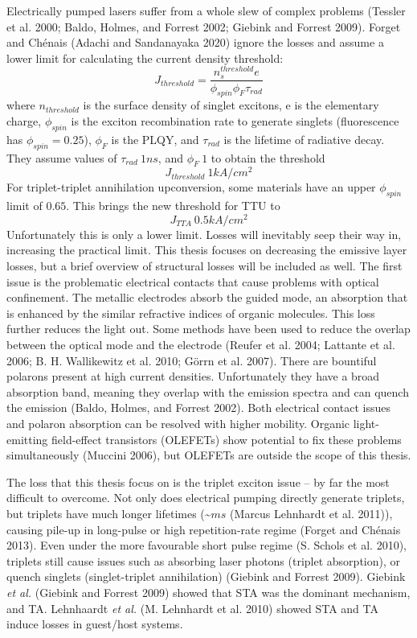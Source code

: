 \documentclass[
  letterpaper,
  DIV=11,
  numbers=noendperiod,
  oneside]{scrreprt}
\begin{document}
Electrically pumped lasers suffer from a whole slew of complex problems
(Tessler et al. 2000; Baldo, Holmes, and Forrest 2002; Giebink and
Forrest 2009). Forget and Chénais (Adachi and Sandanayaka 2020) ignore
the losses and assume a lower limit for calculating the current density
threshold:
\[J_{threshold} = \frac{n_s^{threshold}e}{\phi_{spin} \phi_F\tau_{rad}}\]
where \(n_{threshold}\) is the surface density of singlet excitons, e is
the elementary charge, \(\phi_{spin}\) is the exciton recombination rate
to generate singlets (fluorescence has \(\phi_{spin}=0.25\)), \(\phi_F\)
is the PLQY, and \(\tau_{rad}\) is the lifetime of radiative decay. They
assume values of \(\tau_{rad}~1ns\), and \(\phi_F~1\) to obtain the
threshold \[J_{threshold} ~ 1 kA/cm^2\] For triplet-triplet annihilation
upconversion, some materials have an upper \(\phi_{spin}\) limit of
\(0.65\). This brings the new threshold for TTU to
\[J_{TTA} ~ 0.5 kA/cm^2\] Unfortunately this is only a lower limit.
Losses will inevitably seep their way in, increasing the practical
limit. This thesis focuses on decreasing the emissive layer losses, but
a brief overview of structural losses will be included as well. The
first issue is the problematic electrical contacts that cause problems
with optical confinement. The metallic electrodes absorb the guided
mode, an absorption that is enhanced by the similar refractive indices
of organic molecules. This loss further reduces the light out. Some
methods have been used to reduce the overlap between the optical mode
and the electrode (Reufer et al. 2004; Lattante et al. 2006; B. H.
Wallikewitz et al. 2010; Görrn et al. 2007). There are bountiful
polarons present at high current densities. Unfortunately they have a
broad absorption band, meaning they overlap with the emission spectra
and can quench the emission (Baldo, Holmes, and Forrest 2002). Both
electrical contact issues and polaron absorption can be resolved with
higher mobility. Organic light-emitting field-effect transistors
(OLEFETs) show potential to fix these problems simultaneously (Muccini
2006), but OLEFETs are outside the scope of this thesis.

The loss that this thesis focus on is the triplet exciton issue -- by
far the most difficult to overcome. Not only does electrical pumping
directly generate triplets, but triplets have much longer lifetimes
(\textasciitilde{}\(ms\) (Marcus Lehnhardt et al. 2011)), causing
pile-up in long-pulse or high repetition-rate regime (Forget and Chénais
2013). Even under the more favourable short pulse regime (S. Schols et
al. 2010), triplets still cause issues such as absorbing laser photons
(triplet absorption), or quench singlets (singlet-triplet annihilation)
(Giebink and Forrest 2009). Giebink \emph{et al.} (Giebink and Forrest
2009) showed that STA was the dominant mechanism, and TA. Lehnhaardt
\emph{et al.} (M. Lehnhardt et al. 2010) showed STA and TA induce losses
in guest/host systems.
\end{document}
